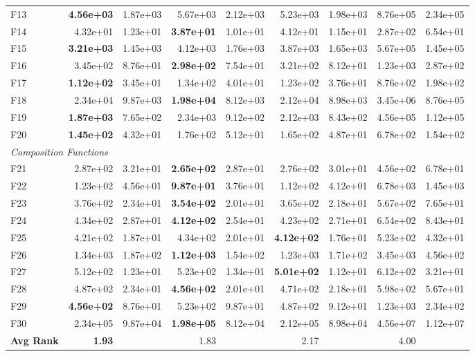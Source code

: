 \documentclass[11pt]{article}
\begin{document}
\begin{table}[ht]
\begin{tabular}{@{}l|rr|rr|rr|rr@{}}
F13 & \textbf{4.56e+03} & 1.87e+03 & 5.67e+03 & 2.12e+03 & 5.23e+03 & 1.98e+03 & 8.76e+05 & 2.34e+05 \\
F14 & 4.32e+01 & 1.23e+01 & \textbf{3.87e+01} & 1.01e+01 & 4.12e+01 & 1.15e+01 & 2.87e+02 & 6.54e+01 \\
F15 & \textbf{3.21e+03} & 1.45e+03 & 4.12e+03 & 1.76e+03 & 3.87e+03 & 1.65e+03 & 5.67e+05 & 1.45e+05 \\
F16 & 3.45e+02 & 8.76e+01 & \textbf{2.98e+02} & 7.54e+01 & 3.21e+02 & 8.12e+01 & 1.23e+03 & 2.87e+02 \\
F17 & \textbf{1.12e+02} & 3.45e+01 & 1.34e+02 & 4.01e+01 & 1.23e+02 & 3.76e+01 & 8.76e+02 & 1.98e+02 \\
F18 & 2.34e+04 & 9.87e+03 & \textbf{1.98e+04} & 8.12e+03 & 2.12e+04 & 8.98e+03 & 3.45e+06 & 8.76e+05 \\
F19 & \textbf{1.87e+03} & 7.65e+02 & 2.34e+03 & 9.12e+02 & 2.12e+03 & 8.43e+02 & 4.56e+05 & 1.12e+05 \\
F20 & \textbf{1.45e+02} & 4.32e+01 & 1.76e+02 & 5.12e+01 & 1.65e+02 & 4.87e+01 & 6.78e+02 & 1.54e+02 \\
\midrule
\multicolumn{9}{l}{\textit{Composition Functions}} \\
\midrule
F21 & 2.87e+02 & 3.21e+01 & \textbf{2.65e+02} & 2.87e+01 & 2.76e+02 & 3.01e+01 & 4.56e+02 & 6.78e+01 \\
F22 & 1.23e+02 & 4.56e+01 & \textbf{9.87e+01} & 3.76e+01 & 1.12e+02 & 4.12e+01 & 6.78e+03 & 1.45e+03 \\
F23 & 3.76e+02 & 2.34e+01 & \textbf{3.54e+02} & 2.01e+01 & 3.65e+02 & 2.18e+01 & 5.67e+02 & 7.65e+01 \\
F24 & 4.34e+02 & 2.87e+01 & \textbf{4.12e+02} & 2.54e+01 & 4.23e+02 & 2.71e+01 & 6.54e+02 & 8.43e+01 \\
F25 & 4.21e+02 & 1.87e+01 & 4.34e+02 & 2.01e+01 & \textbf{4.12e+02} & 1.76e+01 & 5.23e+02 & 4.32e+01 \\
F26 & 1.34e+03 & 1.87e+02 & \textbf{1.12e+03} & 1.54e+02 & 1.23e+03 & 1.71e+02 & 3.45e+03 & 4.56e+02 \\
F27 & 5.12e+02 & 1.23e+01 & 5.23e+02 & 1.34e+01 & \textbf{5.01e+02} & 1.12e+01 & 6.12e+02 & 3.21e+01 \\
F28 & 4.87e+02 & 2.34e+01 & \textbf{4.56e+02} & 2.01e+01 & 4.71e+02 & 2.18e+01 & 5.98e+02 & 5.67e+01 \\
F29 & \textbf{4.56e+02} & 8.76e+01 & 5.23e+02 & 9.87e+01 & 4.87e+02 & 9.12e+01 & 1.23e+03 & 2.34e+02 \\
F30 & 2.34e+05 & 9.87e+04 & \textbf{1.98e+05} & 8.12e+04 & 2.12e+05 & 8.98e+04 & 4.56e+07 & 1.12e+07 \\
\midrule
\textbf{Avg Rank} & \textbf{1.93} & & 1.83 & & 2.17 & & 4.00 & \\
\bottomrule
\end{tabular}
\end{table}
\end{document}
